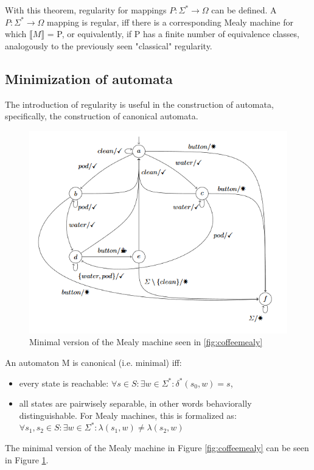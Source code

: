 With this theorem, regularity for mappings $P:\Sigma^*\to\Omega$ can be defined. A $P:\Sigma^*\to\Omega$ mapping is regular, iff there is a corresponding Mealy machine for which $\llbracket M\rrbracket$ = P, or equivalently, if P has a finite number of equivalence classes, analogously to the previously seen "classical" regularity.

\subsection{Minimization of automata}

The introduction of regularity is useful in the construction of automata, specifically, the construction of canonical automata. 


\begin{figure}
	\centering
	\includegraphics[width=0.7\linewidth]{figures/coffeemealyminimal}
	\caption{Minimal version of the Mealy machine seen in \ref{fig:coffeemealy}}
	\label{fig:coffeemealyminimal}
\end{figure}


\begin{definition}
	An automaton M is canonical (i.e. minimal) iff:
	\begin{itemize}
		\item every state is reachable: $\forall s\in S: \exists w\in\Sigma^*: \delta^*(s_0, w) = s$,
		\item all states are pairwisely separable, in other words behaviorally distinguishable. For Mealy machines, this is formalized as: $\forall s_1, s_2\in S: \exists w\in\Sigma^*: \lambda(s_1, w)\neq\lambda(s_2, w)$
	\end{itemize}
\end{definition}

The minimal version of the Mealy machine in Figure \ref{fig:coffeemealy} can be seen in Figure \ref{fig:coffeemealyminimal}.


